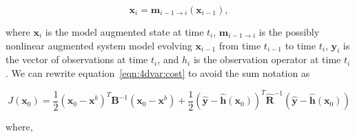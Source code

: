 \documentclass[12pt]{article}
\begin{document}
\begin{equation}
\textbf{x}_{i} = \textbf{m}_{i-1 \rightarrow i}(\textbf{x}_{i-1}), \label{eqn:nonlinmod}
\end{equation}

where \(\textbf{x}_{i}\) is the model augmented state at time \(t_i\), \(\textbf{m}_{i-1 \rightarrow i}\) is the possibly nonlinear augmented system model evolving \(\textbf{x}_{i-1}\) from time \(t_{i-1}\) to time \(t_i\), \(\textbf{y}_i\) is the vector of observations at time \(t_i\), and \(h_i\) is the observation operator at time \(t_i\). We can rewrite equation~\eqref{eqn:4dvar:cost} to avoid the sum notation as

\begin{equation}
J(\textbf{x}_0) = \frac{1}{2}(\textbf{x}_0-\textbf{x}^b)^{T}\textbf{B}^{-1}(\textbf{x}_0-\textbf{x}^b)+\frac{1}{2}(\hat{\textbf{y}}-\hat{\textbf{h}}(\textbf{x}_0))^{T}\hat{\textbf{R}}^{-1}(\hat{\textbf{y}}-\hat{\textbf{h}}(\textbf{x}_0)) \label{costfn}
\end{equation}


where,
\end{document}
